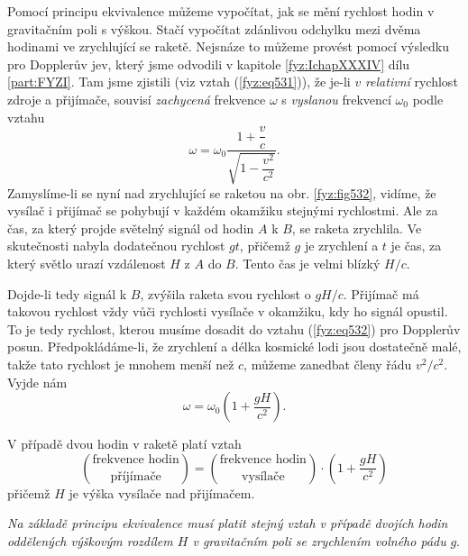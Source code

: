 {    Pomocí principu ekvivalence můžeme vypočítat, jak se mění rychlost hodin v gravitačním poli s 
    výškou. Stačí vypočítat zdánlivou odchylku mezi dvěma hodinami ve zrychlující se raketě. 
    Nejsnáze to můžeme provést pomocí výsledku pro Dopplerův jev, který jsme odvodili v kapitole 
    \ref{fyz:IchapXXXIV} dílu \ref{part:FYZI}. Tam jsme zjistili (viz vztah (\ref{fyz:eq531})), že 
    je-li \(v\) \emph{relativní} rychlost zdroje a přijímače, souvisí \emph{zachycená} frekvence 
    \(\omega\) s \emph{vyslanou} frekvencí \(\omega_0\) podle vztahu
    \begin{equation}\label{fyz:eq532}
      \omega = \omega_0\dfrac{1+\dfrac{v}{c}}{\sqrt{1-\dfrac{v^2}{c^2}}}.
    \end{equation}
    Zamyslíme-li se nyní nad zrychlující se raketou na obr. \ref{fyz:fig532}, vidíme, že vysílač i 
    přijímač se pohybují v každém okamžiku stejnými rychlostmi. Ale za čas, za který projde 
    světelný signál od hodin \(A\) k \(B\), se raketa zrychlila. Ve skutečnosti nabyla dodatečnou 
    rychlost \(gt\), přičemž \(g\) je zrychlení a \(t\) je čas, za který světlo urazí vzdálenost 
    \(H\) z \(A\) do \(B\). Tento čas je velmi blízký \(H/c\). 
    
    Dojde-li tedy signál k \(B\), zvýšila raketa svou rychlost o \(gH/c\). Přijímač má takovou 
    rychlost vždy vůči rychlosti vysílače v okamžiku, kdy ho signál opustil. To je tedy rychlost, 
    kterou musíme dosadit do vztahu (\ref{fyz:eq532}) pro Dopplerův posun. Předpokládáme-li, že 
    zrychlení a délka kosmické lodi jsou dostatečně malé, takže tato rychlost je mnohem menší než 
    \(c\), můžeme zanedbat členy řádu \(v^2/c^2\). Vyjde nám
    \begin{equation}\label{fyz:eq533}
      \omega = \omega_0\left(1 + \dfrac{gH}{c^2}\right).
    \end{equation}
    
    V případě dvou hodin v raketě platí vztah
    \begin{equation*}
      \binom{\text{frekvence hodin}}{\text{příjímače}} 
        = \binom{\text{frekvence hodin}}{\text{vysílače}}\cdot\left(1 + \dfrac{gH}{c^2}\right)
    \end{equation*}
    přičemž \(H\) je výška vysílače nad přijímačem. 
    
    \emph{Na základě principu ekvivalence musí platit stejný vztah v případě dvojích hodin 
    oddělených výškovým rozdílem \(H\) v gravitačním poli se zrychlením volného pádu} \(g\). 
    
}
